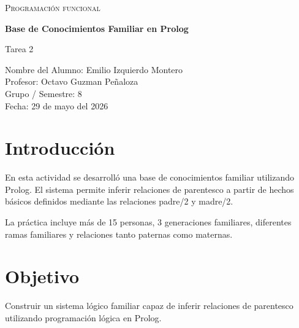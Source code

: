 \documentclass[12pt]{article}
\begin{document}
\begin{titlepage}
    \centering

    {\scshape\Large Programación funcional \par}
    \vspace{1.5cm}

    {\huge\bfseries Base de Conocimientos Familiar en Prolog \par}
    \vspace{0.5cm}
    {\Large Tarea 2 \par}

    \vfill

    {\large
    Nombre del Alumno: Emilio Izquierdo Montero {\hspace{6cm}} \\
    \vspace{0.3cm}
    Profesor: Octavo Guzman Peñaloza {\hspace{6cm}} \\
    \vspace{0.3cm}
    Grupo / Semestre: 8 {\hspace{6cm}} \\
    \vspace{0.3cm}
    Fecha: 29 de mayo del 2026 {\hspace{6cm}}
    \par}

    \vfill

\end{titlepage}

\tableofcontents
\newpage

\section{Introducción}

En esta actividad se desarrolló una base de conocimientos familiar utilizando Prolog. El sistema permite inferir relaciones de parentesco a partir de hechos básicos definidos mediante las relaciones padre/2 y madre/2.

La práctica incluye más de 15 personas, 3 generaciones familiares, diferentes ramas familiares y relaciones tanto paternas como maternas.

\section{Objetivo}

Construir un sistema lógico familiar capaz de inferir relaciones de parentesco utilizando programación lógica en Prolog.
\end{document}
